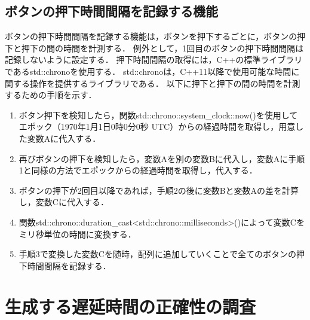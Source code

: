 \subsection{ボタンの押下時間間隔を記録する機能}
ボタンの押下時間間隔を記録する機能は，ボタンを押下するごとに，ボタンの押下と押下の間の時間を計測する．
例外として，1回目のボタンの押下時間間隔は記録しないように設定する．
押下時間間隔の取得には，C++の標準ライブラリであるstd::chronoを使用する．
std::chronoは，C++11以降で使用可能な時間に関する操作を提供するライブラリである．
以下に押下と押下の間の時間を計測するための手順を示す．
\begin{enumerate}[leftmargin=*]
\item ボタン押下を検知したら，関数std::chrono::system\_clock::now()を使用してエポック（1970年1月1日0時0分0秒 UTC）からの経過時間を取得し，用意した変数Aに代入する．
\item 再びボタンの押下を検知したら，変数Aを別の変数Bに代入し，変数Aに手順1と同様の方法でエポックからの経過時間を取得し，代入する．
\item ボタンの押下が2回目以降であれば，手順2の後に変数Bと変数Aの差を計算し，変数Cに代入する．
\item 関数std::chrono::duration\_cast\textless std::chrono::milliseconds\textgreater()によって変数Cをミリ秒単位の時間に変換する．
\item 手順3で変換した変数Cを随時，配列に追加していくことで全てのボタンの押下時間間隔を記録する．
\end{enumerate}
\section{生成する遅延時間の正確性の調査}
